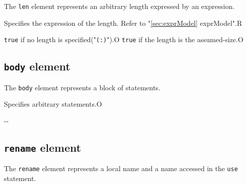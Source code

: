The {\tt len} element represents an arbitrary length expressed by an expression.


\begin{XcodeMLChildElements}
{Specifies the expression of the length. Refer to "\ref{sec:exprModel} exprModel".}{R}
\end{XcodeMLChildElements}

\begin{XcodeMLAttributes}
{{\tt true} if no length is specified("{\tt (:)}").}{O}
{{\tt true} if the length is the assumed-size.}{O}
\end{XcodeMLAttributes}


\subsection{ {\tt body} element}

The {\tt body} element represents a block of statements.


\begin{XcodeMLChildElements}
{Specifies arbitrary statements.}{O}
\end{XcodeMLChildElements}

\begin{XcodeMLAttributes}
\XcodeMLAttrDef{-}{-}
{-}{-}
\end{XcodeMLAttributes}


\subsection{ {\tt rename} element}

The {\tt rename} element represents a local name and a name accessed in the {\tt use} statement.


